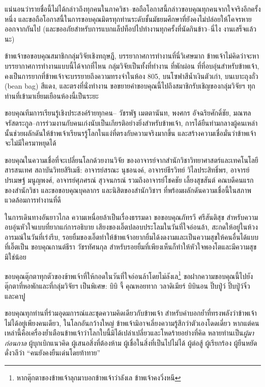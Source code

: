 แน่นอนว่ารายชื่อนี้ไม่ได้กล่าวถึงทุกคนในภาควิชา--ขอถือโอกาสนี้กล่าวขอบคุณทุกคนจากใจจริงอีกครั้งหนึ่ง และขอถือโอกาสนี้ในการขอบคุณมิตรทุกท่านระดับชั้นมัธยมศึกษาที่ยังคงไม่ปล่อยให้โคจรหายออกจากกันไป (และขออภัยสำหรับการแบกแล็ปท็อปไปทำงานทุกครั้งที่นัดกินข้าว--นี่ไง งานเสร็จแล้วนะ)

ข้าพเจ้าขอขอบคุณสมาชิกกลุ่มวิจัยเชิงทฤษฎี, บรรยากาศการทำงานที่นี่วิเศษมาก ข้าพเจ้าไม่คิดว่าจะหาบรรยากาศการทำงานแบบนี้ได้จากที่ไหน กลุ่มวิจัยเป็นทั้งที่ทำงาน ที่พักผ่อน ที่ที่อบอุ่นสำหรับข้าพเจ้า, คงเป็นการยากที่ข้าพเจ้าจะบรรยายถึงความทรงจำในห้อง 805, บนโซฟาสีน้ำเงินตัวเก่า, บนเบาะถุงถั่ว (bean bag) สีแดง, และตรงที่นั่งทำงาน ขอขยายคำขอบคุณนี้ไปถึงสมาชิกรับเชิญของกลุ่มวิจัยฯ ทุกท่านที่เข้ามาเยี่ยมเยือนห้องนี้เป็นระยะ

ขอบคุณทีมการเรียนรู้เชิงประสงค์ร้ายทุกคน--
วัชรพัฐ เมตตานันท, พงศกร อัจฉริยศักดิ์ชัย, มณฑล จรัสตระกูล--การร่วมงานกับคนเก่งนับเป็นเกียรติอย่างยิ่งสำหรับข้าพเจ้า, การได้ยืนท่ามกลางผู้คนเหล่านั้นช่วยผลักดันให้ข้าพเจ้าเรียนรรู้โลกในแง่ที่ตรงกับความจริงมากขึ้น และสร้างความเชื่อมั่นว่าข้าพเจ้าจะไม่มีใครมาหยุดได้

ขอบคุณในความเชื่อที่จะเปลี่ยนโลกด้วยงานวิจัย ของอาจารย์จากสำนักวิชาวิทยาศาสตร์และเทคโนโลยีสารสนเทศ สถาบันวิทยสิริเมธี: อาจารย์สรณะ นุชอนงค์, อาจารย์ธีรวิทย์ วิไลประสิทธิ์พร, อาจารย์ปรเมษฐ์ มนูญพงศ์, อาจารย์ศุภศรณ์ สุวจนกรณ์ รวมถึงอาจารย์โชคชัย เลี้ยงสุขสันต์ คณบดีคนแรกของสำนักวิชา และขอขอบคุณบุคลากร และนิสิตของสำนักวิชาฯ ที่พร้อมผลักดันความเชื่อนี้ในสภาพแวดล้อมการทำงานที่ดี

ในการเดินทางอันยาวไกล ความเหนื่อยล้าเป็นเรื่องธรรมดา ขอขอบคุณภัทรวี ศรีสันติสุข สำหรับความอบอุ่นหัวใจแบบที่ยากแก่การอธิบาย เสียงของเอิ๊ตปลอบประโลมในวันที่ใจอ่อนล้า, สะกดให้อยู่ในห้วงอารมณ์ในวันที่เร่งรีบ, รอยยิ้มของเอิ๊ตทำให้ข้าพเจ้าอยากยิ้มได้งดงามและเป็นความสุขให้คนอื่นได้แบบที่เอิ๊ตเป็น ขอบคุณกานต์ธีรา วัชรทัศนกุล สำหรับรอยยิ้มที่เพียงเห็นก็ทำให้หัวใจพองโตและมีความสุขมิใช่น้อย

ขอบคุณตุ๊กตาทุกตัวของข้าพเจ้าที่ให้กอดในวันที่ใจอ่อนล้าโดยไม่ลังเล\footnote{หากตุ๊กตาของข้าพเจ้าลุกมาบอกข้าพเจ้าว่าลังเล ข้าพเจ้าคงวิ่งหนี} ขอฝากความขอบคุณนี้ไปยังตุ๊กตาที่หอพักและที่กลุ่มวิจัยฯ เป็นพิเศษ: บิบิ จี้ คุณหอยทาก วลาดิเมียร์ บิบินอน ปิ๊บปู่ว์ ปิ๊บปู่ว์จิ๋ว และคาปู

ขอบคุณทุกท่านที่ร่วมอุดมการณ์และชุดความคิดเดียวกับข้าพเจ้า สำหรับคำบอกย้ำที่ทรงพลังว่าข้าพเจ้าไม่ได้อยู่เพียงคนเดียว, ในโลกอันกว้างใหญ่ ข้าพเจ้ามิอาจเลี่ยงความรู้สึกว่าตัวเองโดดเดี่ยว หากแต่คนเหล่านี้คือเครื่องย้ำเตือนข้าพเจ้าว่าโลกใบนี้มิได้เปล่าเปลี่ยวและโหดร้ายอย่างที่คิด หลายท่านเป็น\textit{ผู้มาก่อนกาล} ผู้บุกเบิกแนวคิด ผู้เสนอสิ่งที่ต้องห้าม ผู้เชื่อในสิ่งที่เป็นไปไม่ได้ ผู้ต่อสู้ ผู้เรียกร้อง ผู้ยืนหยัด ดั่งวลีว่า ``คนยังคงยืนเด่นโดยท้าทาย''

